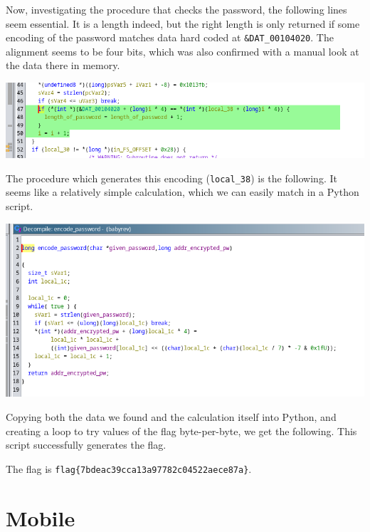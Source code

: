 \documentclass{article}
\begin{document}
\noindent
Now, investigating the procedure that checks the password, the following lines seem essential. It is a length indeed, but the right length is only returned if some encoding of the password matches data hard coded at \texttt{\&DAT_00104020}. The alignment seems to be four bits, which was also confirmed with a manual look at the data there in memory.

\noindent 
\begin{center}
\includegraphics[width=16cm]{babyrev/screenshot3.png}
\end{center}

\noindent
The procedure which generates this encoding (\texttt{local_38}) is the following. It seems like a relatively simple calculation, which we can easily match in a Python script.

\noindent 
\begin{center}
\includegraphics[width=16cm]{babyrev/screenshot4.png}
\end{center}

\noindent
Copying both the data we found and the calculation itself into Python, and creating a loop to try values of the flag byte-per-byte, we get the following. This script successfully generates the flag.



\noindent
The flag is \texttt{flag\{7bdeac39cca13a97782c04522aece87a\}}.

\section{Mobile}
\end{document}
